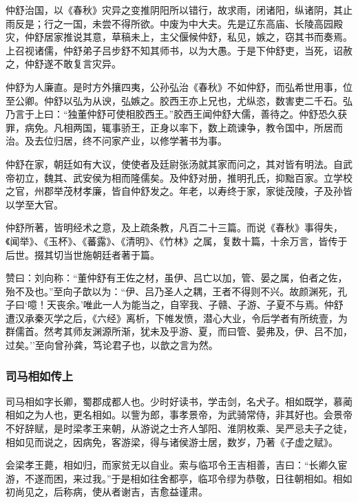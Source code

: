 \documentclass[]{article}
\begin{document}
仲舒治国，以《春秋》灾异之变推阴阳所以错行，故求雨，闭诸阳，纵诸阴，其止雨反是；行之一国，未尝不得所欲。中废为中大夫。先是辽东高庙、长陵高园殿灾，仲舒居家推说其意，草稿未上，主父偃候仲舒，私见，嫉之，窃其书而奏焉。上召视诸儒，仲舒弟子吕步舒不知其师书，以为大愚。于是下仲舒吏，当死，诏赦之，仲舒遂不敢复言灾异。

仲舒为人廉直。是时方外攘四夷，公孙弘治《春秋》不如仲舒，而弘希世用事，位至公卿。仲舒以弘为从谀，弘嫉之。胶西王亦上兄也，尤纵恣，数害吏二千石。弘乃言于上曰：``独董仲舒可使相胶西王。''胶西王闻仲舒大儒，善待之。仲舒恐久获罪，病免。凡相两国，辄事骄王，正身以率下，数上疏谏争，教令国中，所居而治。及去位归居，终不问家产业，以修学著书为事。

仲舒在家，朝廷如有大议，使使者及廷尉张汤就其家而问之，其对皆有明法。自武帝初立，魏其、武安侯为相而隆儒矣。及仲舒对册，推明孔氏，抑黜百家。立学校之官，州郡举茂材孝廉，皆自仲舒发之。年老，以寿终于家，家徙茂陵，子及孙皆以学至大官。

仲舒所著，皆明经术之意，及上疏条教，凡百二十三篇。而说《春秋》事得失，《闻举》、《玉杯》、《蕃露》、《清明》、《竹林》之属，复数十篇，十余万言，皆传于后世。掇其切当世施朝廷者著于篇。

赞曰：刘向称：``董仲舒有王佐之材，虽伊、吕亡以加，管、晏之属，伯者之佐，殆不及也。''至向子歆以为：``伊、吕乃圣人之耦，王者不得则不兴。故颜渊死，孔子曰`噫！天丧余。'唯此一人为能当之，自宰我、子赣、子游、子夏不与焉。仲舒遭汉承秦灭学之后，《六经》离析，下帷发愤，潜心大业，令后学者有所统壹，为群儒首。然考其师友渊源所渐，犹未及乎游、夏，而曰管、晏弗及，伊、吕不加，过矣。''至向曾孙龚，笃论君子也，以歆之言为然。

\hypertarget{header-n4538}{%
\subsubsection{司马相如传上}\label{header-n4538}}

司马相如字长卿，蜀郡成都人也。少时好读书，学击剑，名犬子。相如既学，慕蔺相如之为人也，更名相如。以訾为郎，事孝景帝，为武骑常侍，非其好也。会景帝不好辞赋，是时梁孝王来朝，从游说之士齐人邹阳、淮阴枚乘、吴严忌夫子之徒，相如见而说之，因病免，客游梁，得与诸侯游士居，数岁，乃著《子虚之赋》。

会梁孝王薨，相如归，而家贫无以自业。索与临邛令王吉相善，吉曰：``长卿久宦游，不遂而困，来过我。''于是相如往舍都亭，临邛令缪为恭敬，日往朝相如。相如初尚见之，后称病，使从者谢吉，吉愈益谨肃。
\end{document}
